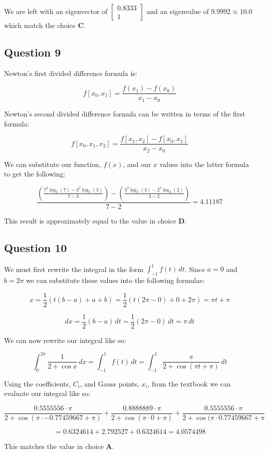 \documentclass[12pt]{article}
\begin{document}
We are left with an eigenvector of $\begin{bmatrix} 0.8333 \\ 1 \end{bmatrix}$ and an eigenvalue of $9.9992 \approx 10.0$ which match the choice \textbf{C}.

\subsection*{Question 9}

Newton's first divided difference formula is:

$$f[x_0, x_1] = \frac{f(x_1) - f(x_0)}{x_1 - x_0}$$

Newton's second divided difference formula can be written in terms of the first formula:

$$f[x_0, x_1, x_2] = \frac{f[x_1, x_2] - f[x_0, x_1]}{x_2 - x_0}$$

We can substitute our function, $f(x)$, and our $x$ values into the latter formula to get the following:

$$\frac{\left( \frac{7^2\log_2(7) - 3^2\log_2(3)}{7 - 3} \right) - \left( \frac{3^2\log_2(3) - 2^2\log_2(2)}{3 - 2} \right)}{7 - 2} = 4.11187$$

This result is approximately equal to the value in choice \textbf{D}.

\subsection*{Question 10}

We must first rewrite the integral in the form $\int_{-1}^1 f(t)\, dt$. Since $a = 0$ and $b = 2\pi$ we can substitute these values into the following formulae:

$$x = \frac{1}{2}\left( t(b - a) + a + b \right) = \frac{1}{2}\left( t(2\pi - 0) + 0 + 2\pi \right) = \pi t + \pi$$

$$dx = \frac{1}{2}(b - a)\, dt = \frac{1}{2}(2\pi - 0)\, dt = \pi\, dt$$

We can now rewrite our integral like so:

$$\int_0^{2\pi} \frac{1}{2 + \cos x}\, dx = \int_{-1}^1 f(t) \, dt = \int_{-1}^1 \frac{\pi}{2 + \cos (\pi t + \pi)} \, dt$$

Using the coefficients, $C_i$, and Gauss points, $x_i$, from the textbook we can evaluate our integral like so:

$$\frac{0.5555556 \cdot \pi}{2 + \cos (\pi \cdot -0.77459667 + \pi)} + \frac{0.8888889 \cdot \pi}{2 + \cos (\pi \cdot 0 + \pi)} + \frac{0.5555556 \cdot \pi}{2 + \cos (\pi \cdot 0.77459667 + \pi}$$

$$= 0.6324614 + 2.792527 + 0.6324614 = 4.0574498$$

This matches the value in choice \textbf{A}.
\end{document}
